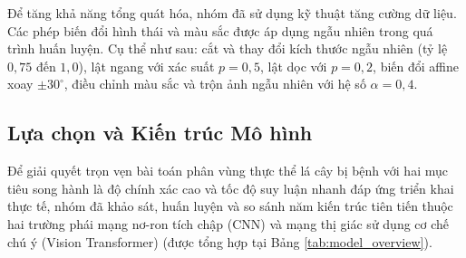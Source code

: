 Để tăng khả năng tổng quát hóa, nhóm đã sử dụng kỹ thuật tăng cường dữ liệu. Các phép biến đổi hình thái và màu sắc được áp dụng ngẫu nhiên trong quá trình huấn luyện. Cụ thể như sau: cắt và thay đổi kích thước ngẫu nhiên (tỷ lệ $0,75$ đến $1,0$), lật ngang với xác suất $p=0,5$, lật dọc với $p=0,2$, biến đổi affine xoay $\pm 30^\circ$, điều chỉnh màu sắc và trộn ảnh ngẫu nhiên với hệ số $\alpha=0,4$.

\subsection{Lựa chọn và Kiến trúc Mô hình}
Để giải quyết trọn vẹn bài toán phân vùng thực thể lá cây bị bệnh với hai mục tiêu song hành là độ chính xác cao và tốc độ suy luận nhanh đáp ứng triển khai thực tế, nhóm đã khảo sát, huấn luyện và so sánh năm kiến trúc tiên tiến thuộc hai trường phái mạng nơ-ron tích chập (CNN) và mạng thị giác sử dụng cơ chế chú ý (Vision Transformer) (được tổng hợp tại Bảng \ref{tab:model_overview}).

